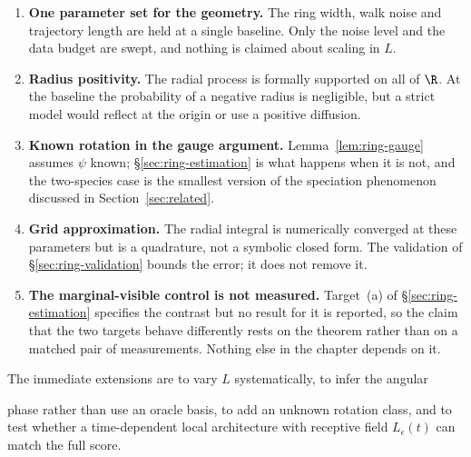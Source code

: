\begin{enumerate}
  \item \textbf{One parameter set for the geometry.} The ring width, walk noise
  and trajectory length are held at a single baseline. Only the noise level and
  the data budget are swept, and nothing is claimed about scaling in $L$.
  \item \textbf{Radius positivity.} The radial process is formally supported on
  all of $\R$. At the baseline the probability of a negative radius is
  negligible, but a strict model would reflect at the origin or use a positive
  diffusion.
  \item \textbf{Known rotation in the gauge argument.}
  Lemma~\ref{lem:ring-gauge} assumes $\psi$ known; \S\ref{sec:ring-estimation}
  is what happens when it is not, and the two-species case is the smallest
  version of the speciation phenomenon discussed in
  Section~\ref{sec:related}.
  \item \textbf{Grid approximation.} The radial integral is numerically
  converged at these parameters but is a quadrature, not a symbolic closed
  form. The validation of \S\ref{sec:ring-validation} bounds the error; it does
  not remove it.
  \item \textbf{The marginal-visible control is not measured.} Target~(a) of
  \S\ref{sec:ring-estimation} specifies the contrast but no result for it is
  reported, so the claim that the two targets behave differently rests on the
  theorem rather than on a matched pair of measurements. Nothing else in the
  chapter depends on it.
\end{enumerate}

The immediate extensions are to vary $L$ systematically, to infer the angular

phase rather than use an oracle basis, to add an unknown rotation class, and to
test whether a time-dependent local architecture with receptive field
$L_\epsilon(t)$ can match the full score.
